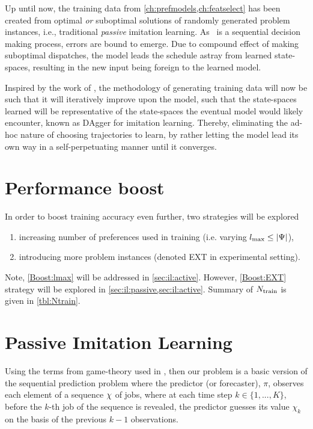 Up until now, the training data from \cref{ch:prefmodels,ch:featselect} has 
been created from optimal \emph{or} suboptimal solutions of randomly generated 
problem instances, i.e., traditional \emph{passive} imitation learning. 
As \JSP\ is a sequential decision making process, errors are bound to emerge.  
Due to compound effect of making suboptimal dispatches, the model leads the 
schedule astray from learned state-spaces, resulting in the new input being 
foreign to the learned model. 

Inspired by the work of \cite{RossB10,RossGB11}, the methodology of generating 
training data will now be such that it will iteratively improve upon the model, 
such that the state-spaces learned will be representative of the state-spaces 
the eventual model would likely encounter, known as DAgger for imitation 
learning.
Thereby, eliminating the ad-hoc nature of choosing trajectories to learn, by 
rather letting the model lead its own way in a self-perpetuating manner until 
it converges.

\section*{Performance boost}
In order to boost training accuracy even further, two strategies will be explored 
\begin{enumerate}[after={{}}, leftmargin=*,
    label={\textbf{Boost.\arabic*}}, ref={{Boost.\arabic*}}]
    \item \label{Boost:lmax} increasing number of preferences used 
    in training (i.e. varying \mbox{$l_{\max} \leq \lvert\Psi\rvert$}),
    \item \label{Boost:EXT} introducing more problem instances 
    (denoted EXT in experimental setting).
\end{enumerate}

Note, \ref{Boost:lmax} will be addressed in \cref{sec:il:active}. 
However, \ref{Boost:EXT} strategy will be explored in \cref{sec:il:passive,sec:il:active}. 
Summary of $N_{\text{train}}$ is given in \cref{tbl:Ntrain}.



\section{Passive Imitation Learning}\label{sec:il:passive}
Using the terms from game-theory used in \citet{CesaBianchi06}, %
then our problem is a basic version of the sequential prediction problem where 
the predictor (or forecaster), $\pi$, observes each element of a sequence 
${\mathbf{\chi}}$ of jobs, where at each time step $k \in \{1,...,K\}$, before the 
$k$-th job of the sequence is revealed, the predictor guesses its value 
$\chi_k$ on the basis of the previous $k-1$ observations. 

